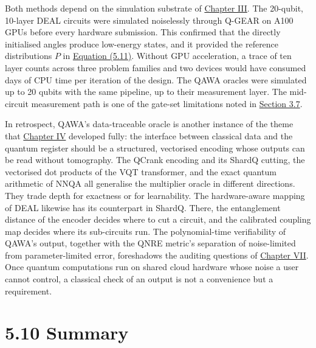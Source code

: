 \documentclass{report}
\theoremstyle{plain}
\theoremstyle{definition}
\theoremstyle{remark}
\begin{document}
Both methods depend on the simulation substrate of \hyperref[ch:qgear]{Chapter III}. The 20-qubit, 10-layer DEAL circuits were simulated noiselessly through Q-GEAR on A100 GPUs before every hardware submission. This confirmed that the directly initialised angles produce low-energy states, and it provided the reference distributions $P$ in \hyperref[eq:nisq:kl]{Equation (5.11)}. Without GPU acceleration, a trace of ten layer counts across three problem families and two devices would have consumed days of CPU time per iteration of the design. The QAWA oracles were simulated up to 20 qubits with the same pipeline, up to their measurement layer. The mid-circuit measurement path is one of the gate-set limitations noted in \hyperref[sec:qgear:discussion]{Section 3.7}.

In retrospect, QAWA's data-traceable oracle is another instance of the theme that \hyperref[ch:qml]{Chapter IV} developed fully: the interface between classical data and the quantum register should be a structured, vectorised encoding whose outputs can be read without tomography. The QCrank encoding and its ShardQ cutting, the vectorised dot products of the VQT transformer, and the exact quantum arithmetic of NNQA all generalise the multiplier oracle in different directions. They trade depth for exactness or for learnability. The hardware-aware mapping of DEAL likewise has its counterpart in ShardQ. There, the entanglement distance of the encoder decides where to cut a circuit, and the calibrated coupling map decides where its sub-circuits run. The polynomial-time verifiability of QAWA's output, together with the QNRE metric's separation of noise-limited from parameter-limited error, foreshadows the auditing questions of \hyperref[ch:qec]{Chapter VII}. Once quantum computations run on shared cloud hardware whose noise a user cannot control, a classical check of an output is not a convenience but a requirement.

\section{5.10 Summary}\label{sec:nisq:summary}
\end{document}
